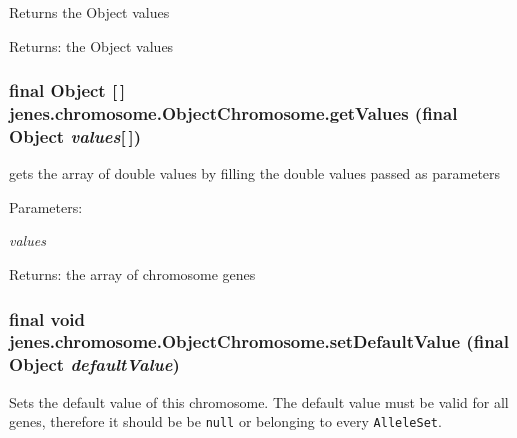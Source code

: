 Returns the Object values 

\begin{Desc}
\item[Returns:]the Object values \end{Desc}
\hypertarget{classjenes_1_1chromosome_1_1_object_chromosome_7476459dce852e9a7fce5d35276817e8}{
\subsubsection[getValues]{\setlength{\rightskip}{0pt plus 5cm}final Object \mbox{[}$\,$\mbox{]} jenes.chromosome.ObjectChromosome.getValues (final Object {\em values}\mbox{[}$\,$\mbox{]})}}
\label{classjenes_1_1chromosome_1_1_object_chromosome_7476459dce852e9a7fce5d35276817e8}


gets the array of double values by filling the double values passed as parameters 

\begin{Desc}
\item[Parameters:]
\begin{description}
\item[{\em values}]\end{description}
\end{Desc}
\begin{Desc}
\item[Returns:]the array of chromosome genes \end{Desc}
\hypertarget{classjenes_1_1chromosome_1_1_object_chromosome_44d425a777314b8e9de58b680e686454}{
\subsubsection[setDefaultValue]{\setlength{\rightskip}{0pt plus 5cm}final void jenes.chromosome.ObjectChromosome.setDefaultValue (final Object {\em defaultValue})}}
\label{classjenes_1_1chromosome_1_1_object_chromosome_44d425a777314b8e9de58b680e686454}


Sets the default value of this chromosome. The default value must be valid for all genes, therefore it should be be {\tt null} or belonging to every {\tt AlleleSet}. 

